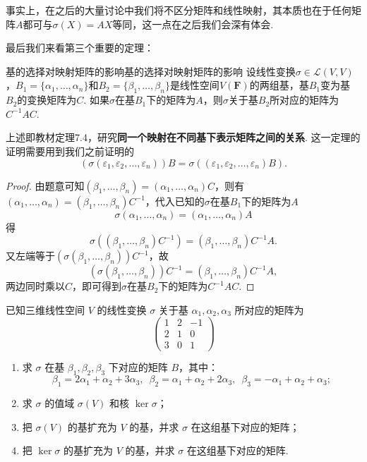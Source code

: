 事实上，在之后的大量讨论中我们将不区分矩阵和线性映射，其本质也在于任何矩阵$A$都可与$\sigma(X)=AX$等同，这一点在之后我们会深有体会.

最后我们来看第三个重要的定理：
\begin{theorem}{基的选择对映射矩阵的影响}{基的选择对映射矩阵的影响}
    设线性变换$\sigma \in \mathcal{L}(V,V)$，$B_1=\{\alpha_1,\ldots,\alpha_n\}$和$B_2=\{\beta_1,\ldots,\beta_n\}$是线性空间$V(\mathbf{F})$的两组基，基$B_1$变为基$B_2$的变换矩阵为$C$. 如果$\sigma$在基$B_1$下的矩阵为$A$，则$\sigma$关于基$B_2$所对应的矩阵为$C^{-1}AC$.
\end{theorem}
上述即教材定理7.4，研究\textbf{同一个映射在不同基下表示矩阵之间的关系}. 这一定理的证明需要用到我们之前证明的
\[(\sigma(\varepsilon_1,\varepsilon_2,\ldots,\varepsilon_n))B=\sigma((\varepsilon_1,\varepsilon_2,\ldots,\varepsilon_n)B).\]

\begin{proof}
    由题意可知$(\beta_1,\ldots,\beta_n)=(\alpha_1,\ldots,\alpha_n)C$，则有$(\alpha_1,\ldots,\alpha_n)=(\beta_1,\ldots,\beta_n)C^{-1}$，代入已知的$\sigma$在基$B_1$下的矩阵为$A$
    \[\sigma(\alpha_1,\ldots,\alpha_n)=(\alpha_1,\ldots,\alpha_n)A\]
    得
    \[\sigma((\beta_1,\ldots,\beta_n)C^{-1})=(\beta_1,\ldots,\beta_n)C^{-1}A.\]
    又左端等于$(\sigma(\beta_1,\ldots,\beta_n))C^{-1}$，故
    \[(\sigma(\beta_1,\ldots,\beta_n))C^{-1}=(\beta_1,\ldots,\beta_n)C^{-1}A,\]
    两边同时乘以$C$，即可得到$\sigma$在基$B_2$下的矩阵为$C^{-1}AC$.
\end{proof}

\begin{example}{}{}
    已知三维线性空间 $V$ 的线性变换 $\sigma$ 关于基 $\alpha_1,\alpha_2,\alpha_3$ 所对应的矩阵为
    \[\begin{pmatrix}1 & 2 & -1 \\ 2 & 1 & 0 \\ 3 & 0 & 1\end{pmatrix}\]
    \begin{enumerate}
        \item 求 $\sigma$ 在基 $\beta_1,\beta_2,\beta_3$ 下对应的矩阵 $B$，其中：
              \[\beta_1=2\alpha_1+\alpha_2+3\alpha_3,\enspace \beta_2=\alpha_1+\alpha_2+2\alpha_3,\enspace \beta_3=-\alpha_1+\alpha_2+\alpha_3;\]

        \item 求 $\sigma$ 的值域 $\sigma(V)$ 和核 $\ker\sigma$；

        \item 把 $\sigma(V)$ 的基扩充为 $V$ 的基，并求 $\sigma$ 在这组基下对应的矩阵；

        \item 把 $\ker\sigma$ 的基扩充为 $V$ 的基，并求 $\sigma$ 在这组基下对应的矩阵.
    \end{enumerate}
\end{example}

